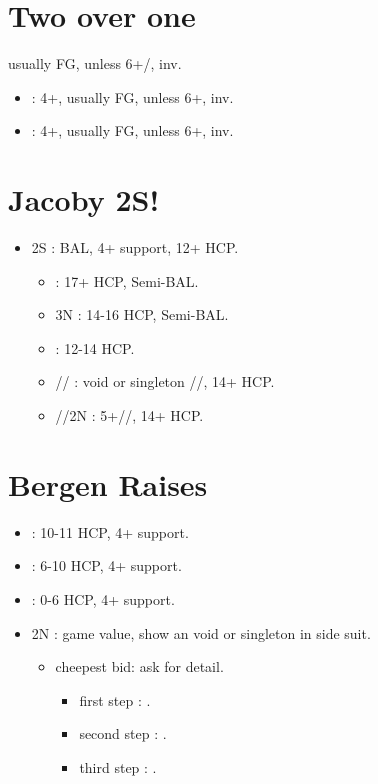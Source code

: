 \documentclass[12pt,twoside,a5paper]{report}%
\begin{document}
	\section*{Two over one}
	usually FG, unless 6+\cl{}/\di{}, inv.
	\begin{itemize}
	\renewcommand{\labelitemi}{}
	\item {} : 4+\cl{}, usually FG, unless 6+\cl{}, inv.
	\item {} : 4+\di{}, usually FG, unless 6+\di{}, inv.
	\end{itemize}
	
	\section*{Jacoby 2S!}
	\begin{itemize}
	\renewcommand{\labelitemi}{}
	\item 2S : BAL, 4+\he{} support, 12+ HCP.
		\begin{itemize}
		\renewcommand{\labelitemi}{--}
		\item {} : 17+ HCP, Semi-BAL.
		\item 3N : 14-16 HCP, Semi-BAL.
		\item {} : 12-14 HCP.
		\item {}// : void or singleton //, 14+ HCP.
		\item {}//2N : 5+//, 14+ HCP.
		\end{itemize}
	\end{itemize}

	\section*{Bergen Raises}
	\begin{itemize}
	\renewcommand{\labelitemi}{}
	\item {} : 10-11 HCP, 4+\he{} support.
	\item {} : 6-10 HCP, 4+\he{} support.
	\item {} : 0-6 HCP, 4+\he{} support.
	\item 2N : game value, show an void or singleton in side suit.
		\begin{itemize}
		\renewcommand{\labelitemi}{--}
		\item cheepest bid: ask for detail.
			\begin{itemize}
			\renewcommand{\labelitemi}{--}
				\item first step : \cl{}.
				\item second step : \di{}.
				\item third step : \sp{}.
			\end{itemize}
		\end{itemize}
	\end{itemize}
\end{document}
